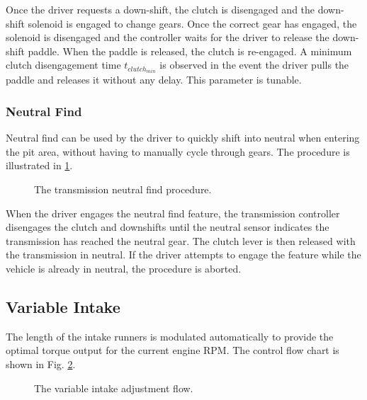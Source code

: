 Once the driver requests a down-shift, the clutch is disengaged and the down-shift solenoid is engaged to change gears. Once the correct gear has engaged, the solenoid is disengaged and the controller waits for the driver to release the down-shift paddle. When the paddle is released, the clutch is re-engaged. A minimum clutch disengagement time $t_{clutch_{min}}$ is observed in the event the driver pulls the paddle and releases it without any delay. This parameter is tunable.


\subsubsection{Neutral Find}

Neutral find can be used by the driver to quickly shift into neutral when entering the pit area, without having to manually cycle through gears. The procedure is illustrated in \ref{fig:transmission_neutralfind_flow}.

\begin{figure}[H]
	\centering
	
	\caption{The transmission neutral find procedure.}
	\label{fig:transmission_neutralfind_flow}
\end{figure}

When the driver engages the neutral find feature, the transmission controller disengages the clutch and downshifts until the neutral sensor indicates the transmission has reached the neutral gear. The clutch lever is then released with the transmission in neutral. If the driver attempts to engage the feature while the vehicle is already in neutral, the procedure is aborted.

\subsection{Variable Intake}

The length of the intake runners is modulated automatically to provide the optimal torque output for the current engine RPM. The control flow chart is shown in Fig. \ref{fig:engine_varintake_flow}. 
\begin{figure}[H]
	\centering
	
	\caption{The variable intake adjustment flow.}
	\label{fig:engine_varintake_flow}
\end{figure}

